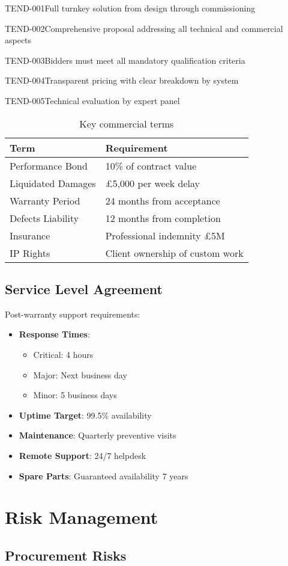 \begin{requirement}{TEND-001}{Full turnkey solution from design through commissioning}
\begin{requirement}{TEND-002}{Comprehensive proposal addressing all technical and commercial aspects}
\begin{requirement}{TEND-003}{Bidders must meet all mandatory qualification criteria}
\begin{requirement}{TEND-004}{Transparent pricing with clear breakdown by system}
\begin{requirement}{TEND-005}{Technical evaluation by expert panel}
\begin{table}[H]
\centering
\begin{tabularx}{\textwidth}{@{}lX@{}}
\toprule
\textbf{Term} & \textbf{Requirement} \\
\midrule
Performance Bond & 10\% of contract value \\
Liquidated Damages & £5,000 per week delay \\
Warranty Period & 24 months from acceptance \\
Defects Liability & 12 months from completion \\
Insurance & Professional indemnity £5M \\
IP Rights & Client ownership of custom work \\
\bottomrule
\end{tabularx}
\caption{Key commercial terms}
\end{table}

\subsection{Service Level Agreement}

Post-warranty support requirements:

\begin{itemize}
    \item \textbf{Response Times}:
        \begin{itemize}
            \item Critical: 4 hours
            \item Major: Next business day
            \item Minor: 5 business days
        \end{itemize}
    \item \textbf{Uptime Target}: 99.5\% availability
    \item \textbf{Maintenance}: Quarterly preventive visits
    \item \textbf{Remote Support}: 24/7 helpdesk
    \item \textbf{Spare Parts}: Guaranteed availability 7 years
\end{itemize}

\section{Risk Management}

\subsection{Procurement Risks}


\end{requirement}
\end{requirement}
\end{requirement}
\end{requirement}
\end{requirement}
